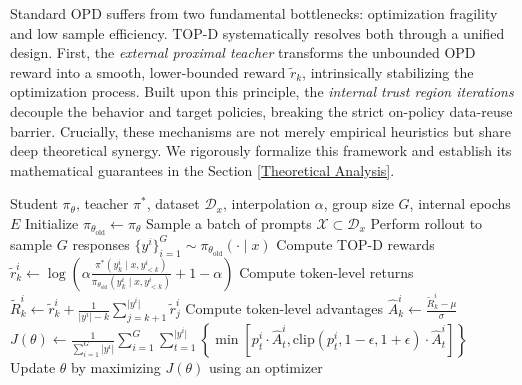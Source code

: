 \documentclass{article}
\theoremstyle{plain}
\theoremstyle{definition}
\theoremstyle{remark}
\begin{document}
Standard OPD suffers from two fundamental bottlenecks: optimization fragility and low sample efficiency. TOP-D systematically resolves both through a unified design. First, the \textit{external proximal teacher} transforms the unbounded OPD reward into a smooth, lower-bounded reward $\tilde{r}_k$, intrinsically stabilizing the optimization process. Built upon this principle, the \textit{internal trust region iterations} decouple the behavior and target policies, breaking the strict on-policy data-reuse barrier. Crucially, these mechanisms are not merely empirical heuristics but share deep theoretical synergy. We rigorously formalize this framework and establish its mathematical guarantees in the Section \ref{Theoretical Analysis}.

\begin{algorithm}[!t]
	\caption{Trust Region Policy Distillation (TOP-D)}
	\label{topd}
	\begin{algorithmic}[1]
		\REQUIRE Student $\pi_{\theta}$, teacher $\pi^*$, dataset $\mathcal{D}_x$, interpolation $\alpha$, group size $G$, internal epochs $E$
		\STATE Initialize $\pi_{\theta_{\mathrm{old}}} \leftarrow \pi_{\theta}$
		\STATE Sample a batch of prompts $\mathcal{X}\subset\mathcal{D}_x$
		\STATE Perform rollout to sample $G$ responses $\{y^{i}\}_{i=1}^{G}\sim\pi_{\theta_{\mathrm{old}}}(\cdot\mid x)$
		\STATE Compute TOP-D rewards $\tilde{r}_k^i\leftarrow\log\left(\alpha\frac{\pi^*(y_k^i\mid x,y_{<k}^i)}{\pi_{\theta_{\mathrm{old}}}(y_k^i\mid x,y_{<k}^i)}+1-\alpha\right)$
		\STATE Compute token-level returns $\tilde{R}_k^i\leftarrow\tilde{r}_k^i+\frac{1}{\lvert y^i\rvert-k}\sum_{j=k+1}^{\lvert y^i\rvert}\tilde{r}_j^i$
		\STATE Compute token-level advantages $\hat{A}_k^i\leftarrow\frac{\tilde{R}_k^i-\mu}{\sigma}$
		\ENDFOR
		\STATE $J(\theta)\leftarrow\frac{1}{\sum_{i=1}^{G}\lvert y^{i}\rvert}\sum_{i=1}^{G}\sum_{t=1}^{\lvert y^{i}\rvert}\left\{\min\left[p_t^i\cdot\hat{A}_t^i,\mathrm{clip}\left(p_t^i,1-\epsilon,1+\epsilon\right)\cdot\hat{A}_t^i\right]\right\}$
		\STATE Update $\theta$ by maximizing $J(\theta)$ using an optimizer
		\ENDFOR
		\ENDWHILE
	\end{algorithmic}
\end{algorithm}
\end{document}
